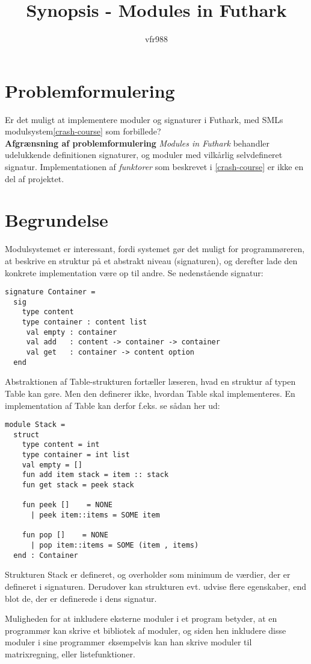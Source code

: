 \documentclass[12pt]{article}
\title{
  Synopsis - Modules in Futhark
}
\author{vfr988}
\begin{document}
\maketitle  
\clearpage

\section{Problemformulering}
Er det muligt at implementere moduler og signaturer i Futhark, med SMLs
modulsystem\ref{crash-course} som forbillede?
\\
\textbf{Afgrænsning af problemformulering}
\textit{Modules in Futhark} behandler udelukkende definitionen signaturer, og
moduler med vilkårlig selvdefineret signatur. Implementationen af
\textit{funktorer} som beskrevet i \ref{crash-course} er ikke en del af
projektet.
\\
\section{Begrundelse}
Modulsystemet er interessant, fordi systemet gør det muligt
for programmøreren, at beskrive en struktur på et
abstrakt niveau (signaturen), og derefter lade den konkrete
implementation være op til andre.
Se nedenstående signatur:
\begin{verbatim}
signature Container = 
  sig
    type content
    type container : content list
     val empty : container
     val add   : content -> container -> container
     val get   : container -> content option
  end
\end{verbatim}
Abstraktionen af Table-strukturen fortæller læseren, hvad en struktur af typen
Table kan gøre. Men den definerer ikke, hvordan Table skal implementeres.
En implementation af Table kan derfor f.eks. se sådan her ud:
\begin{verbatim}
module Stack =
  struct
    type content = int
    type container = int list
    val empty = []
    fun add item stack = item :: stack
    fun get stack = peek stack

    fun peek []    = NONE
      | peek item::items = SOME item

    fun pop []    = NONE
      | pop item::items = SOME (item , items)
  end : Container
\end{verbatim}
Strukturen Stack er defineret, og overholder som minimum de værdier, der er
defineret i signaturen. 
Derudover kan strukturen evt. udvise flere egenskaber, end blot de, der er
definerede i dens signatur.

Muligheden for at inkludere eksterne moduler i et program betyder, at en
programmør kan skrive et bibliotek af moduler, og siden hen inkludere disse
moduler i sine programmer \emph eksempelvis kan han skrive moduler til
matrixregning, eller listefunktioner.
\end{document}
